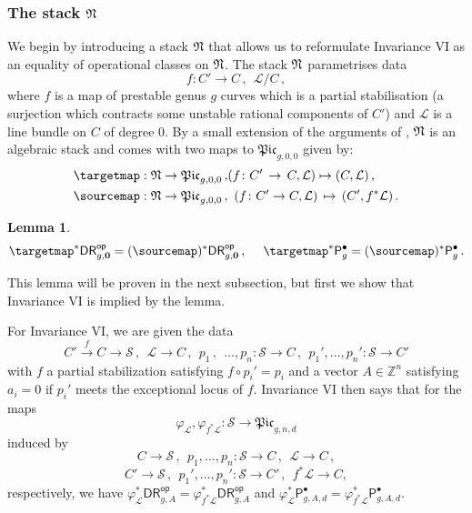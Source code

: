 \documentclass[a4paper,12pt]{article} %
\newcommand{\ca}[1]{{\mathcal{#1}}}
\newcommand{\bd}[1]{{\mathbf{#1}}}
\def\P{\mathsf{P}}
\theoremstyle{definition}
\theoremstyle{plain}%
\newtheorem{lemma}[definition]{Lemma}
\renewcommand{\phi}{\varphi}
\newcommand{\Picabs}{\mathfrak{Pic}}
\newcommand{\invnrIV}{VI}
\newcommand{\DRop}{\mathsf{DR}^{\mathsf{op}}}
\begin{document}
\subsubsection{The stack $\frak N$}
We begin by introducing a stack $\frak N$ that allows us to reformulate Invariance \invnrIV{} as an equality of operational classes on $\frak N$. The stack  $\frak N$ parametrises data
\[f \colon C' \to C\,,\ \ \mathcal{L}/C\,,\]
where $f$ is a map of prestable genus $g$ curves which is a partial stabilisation (a surjection which contracts some unstable rational components of $C'$) and $\ca L$ is a line bundle on $C$ of degree $0$.  By a small extension of the arguments of \cite{Kresch2013Flattening-stra}, 
$\frak N$ is an algebraic stack 
and comes with two maps to $\Picabs_{g,0,0}$ given by:
\begin{eqnarray*}
\targetmap: \frak N \to \Picabs_{g,0,0}\, ,  & (f \colon C' \, \to\,  C, \mathcal{L}) \mapsto (C,\ca L)\, , \\
\sourcemap: \frak N \to \Picabs_{g,0,0}\, , & \ \,(f \colon C' \to C, \mathcal{L})\,  \mapsto\,  (C',f^*\ca L)\,.
\end{eqnarray*}

\begin{lemma}\label{lem:invariance_N}
\begin{equation} \label{eqn:InvIVreformulation}
    \targetmap^*\DRop_{g,\bd 0} = (\sourcemap)^*\DRop_{g, \bd 0}\, ,\ \ \ \ \targetmap^* \P_{g}^\bullet = (\sourcemap)^* \P_g^\bullet\, .
\end{equation}
\end{lemma}
This lemma will be proven in the next subsection, but first we show that Invariance \invnrIV{} is implied  by the lemma. 

For Invariance \invnrIV, we are given the data
\[C' \xrightarrow{f} C \to \ca S\, ,\ \ \ca L \to C\, ,\ \  p_1\, , \ \ \ldots, p_n : \ca S \to C\, ,\ \ p_1', \ldots, p_n' : \ca S \to C'\]
with $f$ a partial stabilization satisfying $f \circ p_i' = p_i$ and a vector $A \in \mathbb{Z}^n$ satisfying $a_i=0$ if $p_i'$ meets the exceptional locus of $f$. Invariance \invnrIV{} then says that for the maps $$\phi_{\ca L}, \phi_{f^* \ca L} : \ca S \to \Picabs_{g,n,d}$$ induced by
\[C \to \ca S\, , \ \ p_1, \ldots, p_n : \ca S \to C\, , \ \ \ca L \to C\, ,\]
\[C' \to \ca S\, ,\ \  p_1', \ldots, p_n' : \ca S \to C'\, ,\ \  f^*\ca L \to C,\]
respectively, we have $\phi_{\ca L}^* \DRop_{g,A} = \phi_{f^*\ca L}^* \DRop_{g,A}$ and $\phi_{\ca L}^* \P^\bullet_{g,A,d} = \phi_{f^*\ca L}^* \P^\bullet_{g,A,d}$. 
\end{document}
